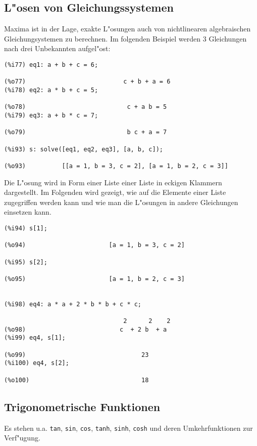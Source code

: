 \documentclass[spanish,12pt,a4paper]{article}
\begin{document}
\subsection{L"osen von Gleichungssystemen}

Maxima ist in der Lage, exakte L"osungen auch von nichtlinearen algebraischen Gleichungsystemen zu berechnen. Im folgenden Beispiel werden 3 Gleichungen nach drei Unbekannten aufgel"ost:

\scriptsize
\begin{verbatim}
(%i77) eq1: a + b + c = 6;

(%o77)                           c + b + a = 6
(%i78) eq2: a * b + c = 5;

(%o78)                            c + a b = 5
(%i79) eq3: a + b * c = 7;

(%o79)                            b c + a = 7

(%i93) s: solve([eq1, eq2, eq3], [a, b, c]);

(%o93)          [[a = 1, b = 3, c = 2], [a = 1, b = 2, c = 3]]
\end{verbatim}
\normalsize

Die L"osung wird in Form einer Liste einer Liste in eckigen Klammern dargestellt. Im Folgenden wird gezeigt, wie auf die Elemente einer Liste zugegriffen werden kann und wie man die L"osungen in andere Gleichungen einsetzen kann.

\scriptsize
\begin{verbatim}
(%i94) s[1];

(%o94)                       [a = 1, b = 3, c = 2]

(%i95) s[2];

(%o95)                       [a = 1, b = 2, c = 3]


(%i98) eq4: a * a + 2 * b * b + c * c;

                                 2      2    2
(%o98)                          c  + 2 b  + a
(%i99) eq4, s[1];

(%o99)                                23
(%i100) eq4, s[2];

(%o100)                               18
\end{verbatim}
\normalsize

\subsection{Trigonometrische Funktionen}

Es stehen u.a. \verb|tan|, \verb|sin|, \verb|cos|, \verb|tanh|, \verb|sinh|, \verb|cosh| und deren Umkehrfunktionen zur Verf"ugung.
\end{document}
